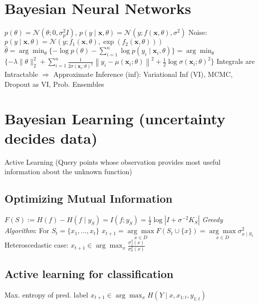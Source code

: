 \documentclass[a4paper, 11pt, landscape]{article}
\begin{document}
\begin{multicols*}{3}
\section{Bayesian Neural Networks}
$p(\theta)=\mathcal{N}\left(\theta ; 0, \sigma_{p}^{2} I\right)$, \space\space $p(y \mid \mathbf{x}, \theta)=\mathcal{N}\left(y ; f(\mathbf{x}, \theta), \sigma^{2}\right)$
\newline Noise: $p(y \mid \mathbf{x}, \theta)=\mathcal{N}\left(y ; f_{1}(\mathbf{x}, \theta), \exp \left(f_{2}(\mathbf{x}, \theta)\right)\right)$
\newline $\hat{\theta}=\arg \min _{\theta}\{-\log p(\theta)-\sum_{i=1}^{n} \log p\left(y_{i} \mid \mathbf{x}_{i}, \theta\right)\}=\arg \min _{\theta}$
\newline $\{-\lambda\|\theta\|_{2}^{2}+\sum_{i=1}^{n} \frac{1}{2 \sigma\left(\mathbf{x}_{i} ; \theta\right)^{2}}\left\|y_{i}-\mu\left(\mathbf{x}_{i} ; \theta\right)\right\|^{2}+\frac{1}{2} \log \sigma\left(\mathbf{x}_{i} ; \theta\right)^{2}\}$
\newline Integrals are Intractable $\Rightarrow$ Approximate Inference (inf):
\newline Variational Inf (VI), MCMC, Dropout as VI, Prob. Ensembles

\section{Bayesian Learning (uncertainty decides data)}
Active Learning (Query points whose observation provides most useful information about the unknown function)

\subsection{Optimizing Mutual Information}
$F(S):=H(f)-H\left(f \mid y_{S}\right)=I\left(f ; y_{S}\right)=\frac{1}{2} \log \left|I+\sigma^{-2} K_{S}\right|$
\newline \textit{Greedy Algorithm}: For $S_t = \{x_1,...,x_t\}$
\newline $x_{t+1}=\underset{{x \in D}}{\arg \max }  F\left(S_{t} \cup\{x\}\right)=\underset{{x \in D}}{\arg \max }  \sigma_{x \mid S_{t}}^{2}$
\newline Heteroscedastic case: $x_{t+1} \in \arg \max _{x} \frac{\sigma_{f}^{2}(x)}{\sigma_{n}^{2}(x)}$

\subsection{Active learning for classification}
Max. entropy of pred. label $x_{t+1} \in \arg \max _{x} H\left(Y \mid x, x_{1: t}, y_{1: t}\right)$


\end{multicols*}
\end{document}
